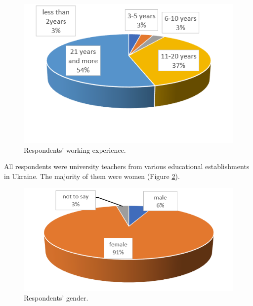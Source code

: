 \documentclass[english]{textolivre}
\begin{document}
\begin{figure}[h!]
    \centering
    \begin{minipage}{0.65\linewidth}
    \includegraphics[width=\linewidth]{Imagens/Figure2.png}
    \caption{Respondents’ working experience.}
    \label{fig-2}
    \end{minipage}
\end{figure}

All respondents were university teachers from various educational establishments in Ukraine. The majority of them were women (Figure \ref{fig-3}).

\begin{figure}[h!]
    \centering
    \begin{minipage}{0.7\linewidth}
    \includegraphics[width=\linewidth]{Imagens/Figure3.png}
    \caption{Respondents’ gender.}
    \label{fig-3}
    \end{minipage}
\end{figure}
\end{document}
